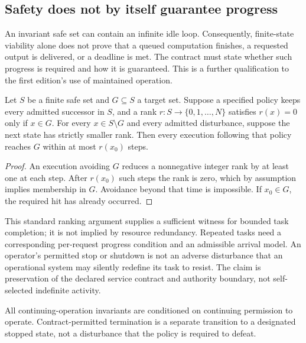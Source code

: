 \subsection{Safety does not by itself guarantee progress}\label{sec:progress}
An invariant safe set can contain an infinite idle loop. Consequently, finite-state viability alone does not prove that a queued computation finishes, a requested output is delivered, or a deadline is met. The contract must state whether such progress is required and how it is guaranteed. This is a further qualification to the first edition's use of maintained operation.

\begin{proposition}\label{prop:progress}
Let $S$ be a finite safe set and $G\subseteq S$ a target set. Suppose a specified policy keeps every admitted successor in $S$, and a rank $r:S\to\{0,1,\ldots,N\}$ satisfies $r(x)=0$ only if $x\in G$. For every $x\in S\setminus G$ and every admitted disturbance, suppose the next state has strictly smaller rank. Then every execution following that policy reaches $G$ within at most $r(x_0)$ steps.
\end{proposition}
\begin{proof}
An execution avoiding $G$ reduces a nonnegative integer rank by at least one at each step. After $r(x_0)$ such steps the rank is zero, which by assumption implies membership in $G$. Avoidance beyond that time is impossible. If $x_0\in G$, the required hit has already occurred.
\end{proof}

This standard ranking argument supplies a sufficient witness for bounded task completion; it is not implied by resource redundancy. Repeated tasks need a corresponding per-request progress condition and an admissible arrival model. An operator's permitted stop or shutdown is not an adverse disturbance that an operational system may silently redefine its task to resist. The claim is preservation of the declared service contract and authority boundary, not self-selected indefinite activity.

All continuing-operation invariants are conditioned on continuing permission to operate. Contract-permitted termination is a separate transition to a designated stopped state, not a disturbance that the policy is required to defeat.
